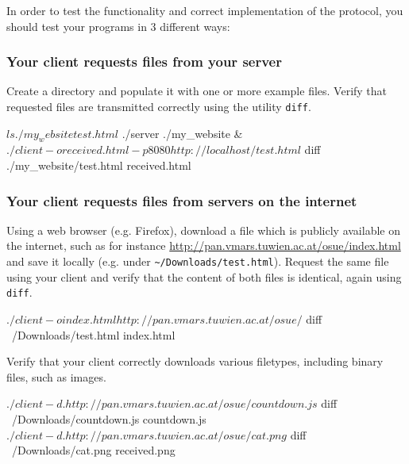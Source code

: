 In order to test the functionality and correct implementation of the protocol,
you should test your programs in 3 different ways:

\vspace{-4mm}

\subsubsection*{Your client requests files from your server}

\vspace{-4mm}
Create a directory and populate it with one or more example files.
Verify that requested files are transmitted correctly
using the utility \verb|diff|.

\begin{osuefmtcode}
    $ ls ./my_website
    test.html
    $ ./server ./my_website &
    $ ./client -o received.html -p 8080 http://localhost/test.html
    $ diff ./my_website/test.html received.html
\end{osuefmtcode}

\subsubsection*{Your client requests files from servers on the internet}

\vspace{-4mm}
Using a web browser (e.g. Firefox),
download a file which is publicly available on the internet,
such as for instance \url{http://pan.vmars.tuwien.ac.at/osue/index.html}
and save it locally (e.g. under \verb|~/Downloads/test.html|).
Request the same file using your client
and verify that the content of both files is identical,
again using \verb|diff|.

\begin{osuefmtcode}
    $ ./client -o index.html http://pan.vmars.tuwien.ac.at/osue/
    $ diff ~/Downloads/test.html index.html
\end{osuefmtcode}

Verify that your client correctly downloads various filetypes,
including binary files, such as images.

\begin{osuefmtcode}
    $ ./client -d . http://pan.vmars.tuwien.ac.at/osue/countdown.js
    $ diff ~/Downloads/countdown.js countdown.js
    $ ./client -d . http://pan.vmars.tuwien.ac.at/osue/cat.png
    $ diff ~/Downloads/cat.png received.png
\end{osuefmtcode}

